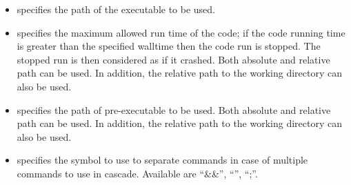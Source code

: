 \subnodesIntro
%
\begin{itemize}
  \item {}  specifies the path
  of the executable to be used.

  \item {}   specifies the maximum
  allowed run time of the code; if the code running time is greater than the specified
  walltime then the code run is stopped. The stopped run is then considered as if it crashed.
  \nb Both absolute and relative path can be used. In addition, the relative path
  to the working directory can also be used.
  \item {}  specifies the path of
    pre-executable to be used.
  \nb Both absolute and relative path can be used. In addition, the relative path
  to the working directory can also be used.
  \item {}  specifies the symbol to use to separate commands
  in case of multiple commands to use in cascade. Available are ``\&\&'', ``\vert\vert'', ``;''.
  

\end{itemize}
